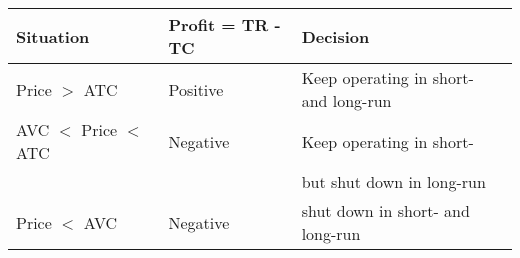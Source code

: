 \begin{table}[]
    \centering
    \begin{tabular}{lll}
    \hline
    Situation & Profit = TR - TC & Decision \\
    \hline
    Price $>$ ATC & Positive & Keep operating in short- and long-run \\
    AVC $<$ Price $<$ ATC & Negative & Keep operating in short-  \\
     & & but shut down in long-run \\
    Price $<$ AVC & Negative & shut down in short- and long-run \\
    \hline
    \end{tabular}
\end{table}